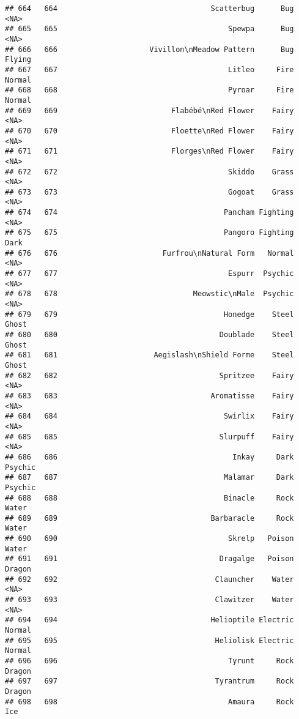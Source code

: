 \documentclass[
]{article}
\begin{document}
\begin{verbatim}
## 664   664                                   Scatterbug      Bug     <NA>
## 665   665                                       Spewpa      Bug     <NA>
## 666   666                     Vivillon\nMeadow Pattern      Bug   Flying
## 667   667                                       Litleo     Fire   Normal
## 668   668                                       Pyroar     Fire   Normal
## 669   669                          Flabébé\nRed Flower    Fairy     <NA>
## 670   670                          Floette\nRed Flower    Fairy     <NA>
## 671   671                          Florges\nRed Flower    Fairy     <NA>
## 672   672                                       Skiddo    Grass     <NA>
## 673   673                                       Gogoat    Grass     <NA>
## 674   674                                      Pancham Fighting     <NA>
## 675   675                                      Pangoro Fighting     Dark
## 676   676                        Furfrou\nNatural Form   Normal     <NA>
## 677   677                                       Espurr  Psychic     <NA>
## 678   678                               Meowstic\nMale  Psychic     <NA>
## 679   679                                      Honedge    Steel    Ghost
## 680   680                                     Doublade    Steel    Ghost
## 681   681                      Aegislash\nShield Forme    Steel    Ghost
## 682   682                                     Spritzee    Fairy     <NA>
## 683   683                                   Aromatisse    Fairy     <NA>
## 684   684                                      Swirlix    Fairy     <NA>
## 685   685                                     Slurpuff    Fairy     <NA>
## 686   686                                        Inkay     Dark  Psychic
## 687   687                                      Malamar     Dark  Psychic
## 688   688                                      Binacle     Rock    Water
## 689   689                                   Barbaracle     Rock    Water
## 690   690                                       Skrelp   Poison    Water
## 691   691                                     Dragalge   Poison   Dragon
## 692   692                                    Clauncher    Water     <NA>
## 693   693                                    Clawitzer    Water     <NA>
## 694   694                                   Helioptile Electric   Normal
## 695   695                                    Heliolisk Electric   Normal
## 696   696                                       Tyrunt     Rock   Dragon
## 697   697                                    Tyrantrum     Rock   Dragon
## 698   698                                       Amaura     Rock      Ice

\end{verbatim}
\end{document}
